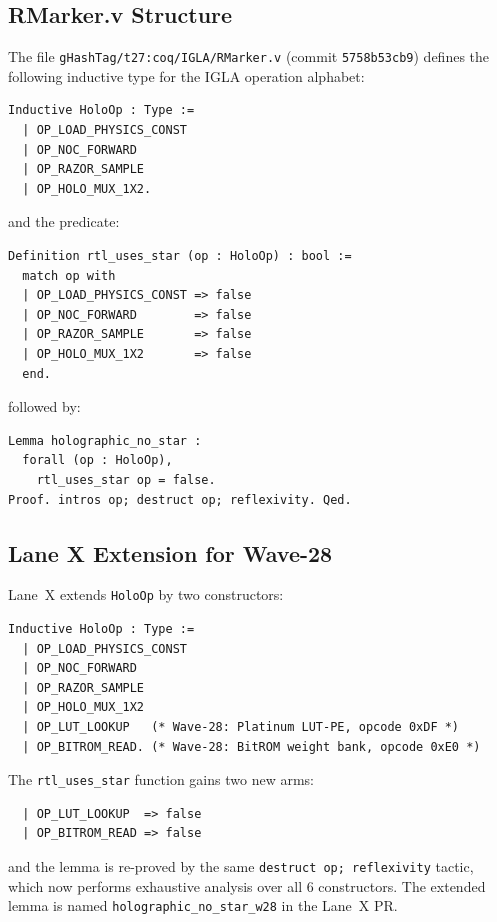 \subsection{RMarker.v Structure}

The file \texttt{gHashTag/t27:coq/IGLA/RMarker.v} (commit \texttt{5758b53cb9})
defines the following inductive type for the IGLA operation alphabet:

\begin{verbatim}
Inductive HoloOp : Type :=
  | OP_LOAD_PHYSICS_CONST
  | OP_NOC_FORWARD
  | OP_RAZOR_SAMPLE
  | OP_HOLO_MUX_1X2.
\end{verbatim}

and the predicate:

\begin{verbatim}
Definition rtl_uses_star (op : HoloOp) : bool :=
  match op with
  | OP_LOAD_PHYSICS_CONST => false
  | OP_NOC_FORWARD        => false
  | OP_RAZOR_SAMPLE       => false
  | OP_HOLO_MUX_1X2       => false
  end.
\end{verbatim}

followed by:

\begin{verbatim}
Lemma holographic_no_star :
  forall (op : HoloOp),
    rtl_uses_star op = false.
Proof. intros op; destruct op; reflexivity. Qed.
\end{verbatim}

\subsection{Lane X Extension for Wave-28}

Lane~X extends \texttt{HoloOp} by two constructors:

\begin{verbatim}
Inductive HoloOp : Type :=
  | OP_LOAD_PHYSICS_CONST
  | OP_NOC_FORWARD
  | OP_RAZOR_SAMPLE
  | OP_HOLO_MUX_1X2
  | OP_LUT_LOOKUP   (* Wave-28: Platinum LUT-PE, opcode 0xDF *)
  | OP_BITROM_READ. (* Wave-28: BitROM weight bank, opcode 0xE0 *)
\end{verbatim}

The \texttt{rtl\_uses\_star} function gains two new arms:

\begin{verbatim}
  | OP_LUT_LOOKUP  => false
  | OP_BITROM_READ => false
\end{verbatim}

and the lemma is re-proved by the same \texttt{destruct op; reflexivity} tactic,
which now performs exhaustive analysis over all 6 constructors.  The extended
lemma is named \texttt{holographic\_no\_star\_w28} in the Lane~X PR.

